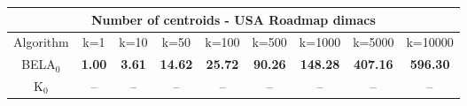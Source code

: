 \begin{tabular}{c|cccccccc}\toprule
\multicolumn{9}{c}{Number of centroids - USA Roadmap dimacs}\\ \midrule
Algorithm & k=1 & k=10 & k=50 & k=100 & k=500 & k=1000 & k=5000 & k=10000 \\ \midrule
BELA$_0$ & \textbf{1.00} & \textbf{3.61} & \textbf{14.62} & \textbf{25.72} & \textbf{90.26} & \textbf{148.28} & \textbf{407.16} & \textbf{596.30} \\
K$_0$ & -- & -- & -- & -- & -- & -- & -- & -- \\ \bottomrule 
\end{tabular}
